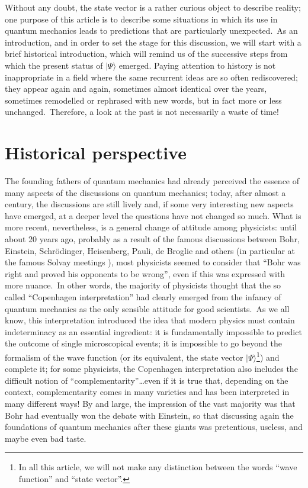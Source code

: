 \documentclass[12pt,onecolumn]{article}%
\begin{document}
Without any doubt, the state vector is a rather curious object to describe
reality; one purpose of this article is to describe some situations in which
its use in quantum mechanics leads to predictions that are particularly
unexpected.\ As an introduction, and in order to set the stage for this
discussion, we will start with a brief historical introduction, which will
remind us of the successive steps from which the present status of $|\Psi\rangle $
emerged. Paying attention to history is not inappropriate in a field where the
same recurrent ideas are so often rediscovered; they appear again and again,
sometimes almost identical over the years, sometimes remodelled or rephrased
with new words, but in fact more or less unchanged.\ Therefore, a look at the
past is not necessarily a waste of time!

\section{Historical perspective}

\label{historical}

The founding fathers of quantum mechanics had already perceived the essence of
many aspects of the discussions on quantum mechanics; today, after almost a
century, the discussions are still lively and, if some very interesting new
aspects have emerged, at a deeper level the questions have not changed so
much. What is more recent, nevertheless, is a general change of attitude among
physicists: until about 20 years ago, probably as a result of the famous
discussions between Bohr, Einstein, Schr\"{o}dinger, Heisenberg, Pauli, de
Broglie and others (in particular at the famous Solvay meetings \cite{Bohr}),
most physicists seemed to consider that ``Bohr was right and proved his
opponents to be wrong'', even if this was expressed with more nuance.\ In
other words, the majority of physicists thought that the so called
``Copenhagen interpretation'' had clearly emerged from the infancy of quantum
mechanics as the only sensible attitude for good scientists.\ As we all know,
this interpretation introduced the idea that modern physics must contain
indeterminacy as an essential ingredient: it is fundamentally impossible to
predict the outcome of single microscopical events; it is impossible to go
beyond the formalism of the wave function (or its equivalent, the state vector
$|\Psi\rangle $\footnote{In all this article, we will not make any distinction
between the words ``wave function'' and ``state vector''.}) and complete it;
for some physicists, the Copenhagen interpretation also includes the difficult
notion of ``complementarity''\ldots  even if it is true that, depending on the
context, complementarity comes in many varieties and has been interpreted in
many different ways! By and large, the impression of the vast majority was
that Bohr had eventually won the debate with Einstein, so that discussing
again the foundations of quantum mechanics after these giants was pretentious,
useless, and maybe even bad taste.
\end{document}
